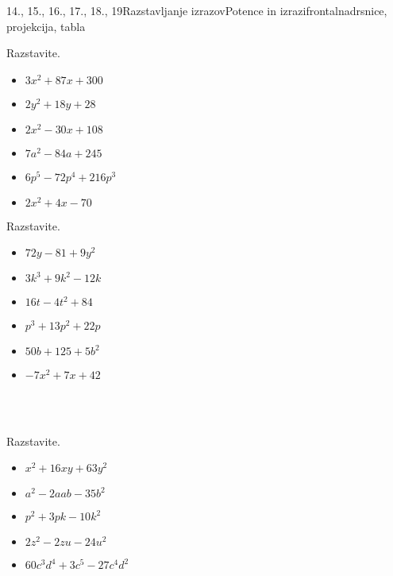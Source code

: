 \begin{priprava}{14., 15., 16., 17., 18., 19}{}{Razstavljanje izrazov}{Potence in izrazi}{frontalna}{drsnice, projekcija, tabla}
\begin{multicols}{2}
            \begin{naloga}
                Razstavite.
                \begin{itemize}
                    \item $3x^2+87x+300$ 
                    \item $2y^2+18y+28$ 
                    \item $2x^2-30x+108$ 
                    \item $7a^2-84a+245$ 
                    \item $6p^5-72p^4+216p^3$ 
                    \item $2x^2+4x-70$ 
                \end{itemize}
            \end{naloga}
        
    
        
            \begin{naloga}
                Razstavite.
                \begin{itemize}
                    \item $72y-81+9y^2$ 
                    \item $3k^3+9k^2-12k$ 
                    \item $16t-4t^2+84$ 
                    \item $p^3+13p^2+22p$ 
                    \item $50b+125+5b^2$ 
                    \item $-7x^2+7x+42$ 
                \end{itemize}
            \end{naloga}
        
    ~\\~\\
        
            \begin{naloga}
                Razstavite.
                \begin{itemize}
                    \item $x^2+16xy+63y^2$ 
                    \item $a^2-2aab-35b^2$ 
                    \item $p^2+3pk-10k^2$ 
                    \item $2z^2-2zu-24u^2$ 
                    \item $60c^3d^4+3c^5-27c^4d^2$ 
                \end{itemize}
            \end{naloga}
        

\end{multicols}
\end{priprava}
